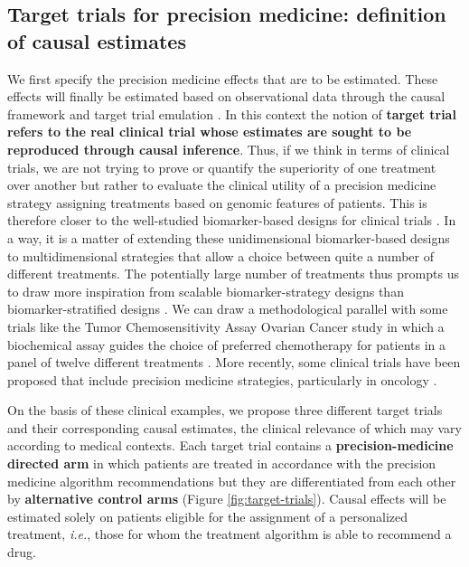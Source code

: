 \documentclass[a4paper,12pt,twoside,onecolumn,openright,final,oldfontcommands]{memoir}
\begin{document}
\subsection{Target trials for precision medicine: definition of causal
estimates}\label{causal-estimates}

We first specify the precision medicine effects that are to be
estimated. These effects will finally be estimated based on
observational data through the causal framework and target trial
emulation \citep{hernan2016using}. In this context the notion of
\textbf{target trial refers to the real clinical trial whose estimates
are sought to be reproduced through causal inference}. Thus, if we think
in terms of clinical trials, we are not trying to prove or quantify the
superiority of one treatment over another but rather to evaluate the
clinical utility of a precision medicine strategy assigning treatments
based on genomic features of patients. This is therefore closer to the
well-studied biomarker-based designs for clinical trials
\citep{freidlin2010randomized}. In a way, it is a matter of extending
these unidimensional biomarker-based designs to multidimensional
strategies that allow a choice between quite a number of different
treatments. The potentially large number of treatments thus prompts us
to draw more inspiration from scalable biomarker-strategy designs than
biomarker-stratified designs \citep{freidlin2010randomized}. We can draw
a methodological parallel with some trials like the Tumor
Chemosensitivity Assay Ovarian Cancer study in which a biochemical assay
guides the choice of preferred chemotherapy for patients in a panel of
twelve different treatments \citep{cree2007prospective}. More recently,
some clinical trials have been proposed that include precision medicine
strategies, particularly in oncology
\citep{von2010pilot, le2015molecularly, flaherty2020molecular}.

On the basis of these clinical examples, we propose three different
target trials and their corresponding causal estimates, the clinical
relevance of which may vary according to medical contexts. Each target
trial contains a \textbf{precision-medicine directed arm} in which
patients are treated in accordance with the precision medicine algorithm
recommendations but they are differentiated from each other by
\textbf{alternative control arms} (Figure \ref{fig:target-trials}).
Causal effects will be estimated solely on patients eligible for the
assignment of a personalized treatment, \emph{i.e.}, those for whom the
treatment algorithm is able to recommend a drug.
\end{document}
